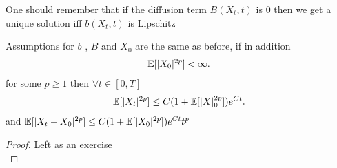 \begin{remark}
  One should remember that if the diffusion term $B(X_t,t)$ is 0 then we get a unique solution iff $b(X_t,t)$ is Lipschitz
\end{remark}
\begin{theorem}
  Assumptions for $b$ , $B$ and $X_{0}$ are the same as before, if in addition 
  \begin{align*}
    \mathbb{E}[\lvert X_0\rvert^{2p} ]< \infty
  .\end{align*}
  for some $p \ge 1$ then $\forall  t \in  [0,T]$ 
  \begin{align*}
    \mathbb{E}[\lvert X_t\rvert^{2p}]\le C(1+\mathbb{E}[\lvert X\rvert_0^{2p} ])e^{Ct} 
  .\end{align*}
  and $\mathbb{E}[\lvert X_t - X_0\rvert^{2p} ] \le  C(1+\mathbb{E}[\lvert X_0\rvert^{2p} ])e^{Ct}t^p $
\end{theorem}
\begin{proof}
 Left as an exercise \\
\end{proof}
\newpage
